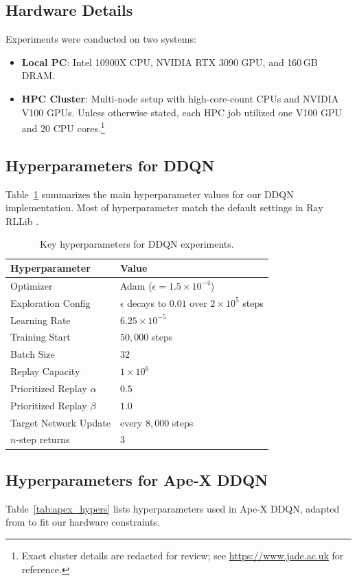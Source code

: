 \documentclass[10pt]{article} %
\begin{document}
\subsection{Hardware Details}
Experiments were conducted on two systems:
\begin{itemize}[leftmargin=*]
    \item \textbf{Local PC}: Intel 10900X CPU, NVIDIA RTX 3090 GPU, and 160\,GB DRAM.
    \item \textbf{HPC Cluster}: Multi-node setup with high-core-count CPUs and NVIDIA V100 GPUs.
    Unless otherwise stated, each HPC job utilized one V100 GPU and 20 CPU cores.\footnote{Exact cluster details are redacted for review; see \url{https://www.jade.ac.uk} for reference.}
\end{itemize}

\subsection{Hyperparameters for DDQN}
Table~\ref{tab:ddqn_hypers} summarizes the main hyperparameter values for our DDQN implementation. 
Most of hyperparameter match the default settings in Ray RLLib \citep{RayprojectRlexperiments_ray_2022}.
\begin{table}[h]
\centering
\begin{tabular}{l|l}
\toprule
\textbf{Hyperparameter} & \textbf{Value} \\
\midrule
Optimizer & Adam ($\epsilon = 1.5 \times 10^{-4}$) \\
Exploration Config & $\epsilon$ decays to $0.01$ over $2 \times 10^{5}$ steps \\
Learning Rate & $6.25 \times 10^{-5}$ \\
Training Start & $50,000$ steps \\
Batch Size & $32$ \\
Replay Capacity & $1 \times 10 ^{6}$ \\
Prioritized Replay $\alpha$ & $0.5$ \\
Prioritized Replay $\beta$ & $1.0$ \\
Target Network Update & every $8,000$ steps \\
$n$-step returns & $3$ \\
\bottomrule
\end{tabular}
\caption{Key hyperparameters for DDQN experiments.}
\label{tab:ddqn_hypers}
\end{table}
\subsection{Hyperparameters for Ape-X DDQN}
Table~\ref{tab:apex_hypers} lists hyperparameters used in Ape-X DDQN, adapted from \citet{DistributedPrioritizedExperience_horgan_2018} to fit our hardware constraints.
\end{document}
